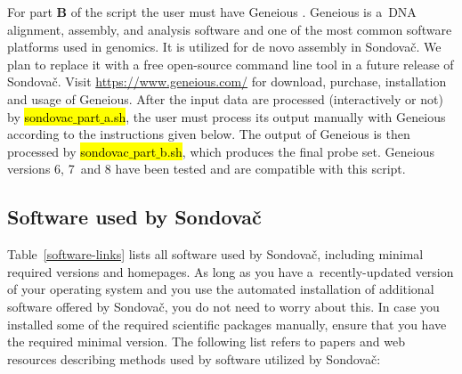 \documentclass[a4paper, 11pt, twoside]{article}
\renewcommand{\texttt}[1]{\hl{\ttfamily #1}}
\begin{document}
For part \textbf{B} of the script the user must have Geneious \citep{Kearse2012}. Geneious is a~DNA alignment, assembly, and analysis software and one of the most common software platforms used in genomics. It is utilized for de novo assembly in Sondovač. We plan to replace it with a free open-source command line tool in a future release of Sondovač. Visit \url{https://www.geneious.com/} for download, purchase, installation and usage of Geneious. After the input data are processed (interactively or not) by \texttt{sondovac$\_$part$\_$a.sh}, the user must process its output manually with Geneious according to the instructions given below. The output of Geneious is then processed by \texttt{sondovac$\_$part$\_$b.sh}, which produces the final probe set. Geneious versions 6, 7~and 8 have been tested and are compatible with this script.

\subsection{Software used by Sondovač}

Table~\ref{software-links} lists all software used by Sondovač, including minimal required versions and homepages. As long as you have a~recently-updated version of your operating system and you use the automated installation of additional software offered by Sondovač, you do not need to worry about this. In case you installed some of the required scientific packages manually, ensure that you have the required minimal version. The following list refers to papers and web resources describing methods used by software utilized by Sondovač:
\end{document}
